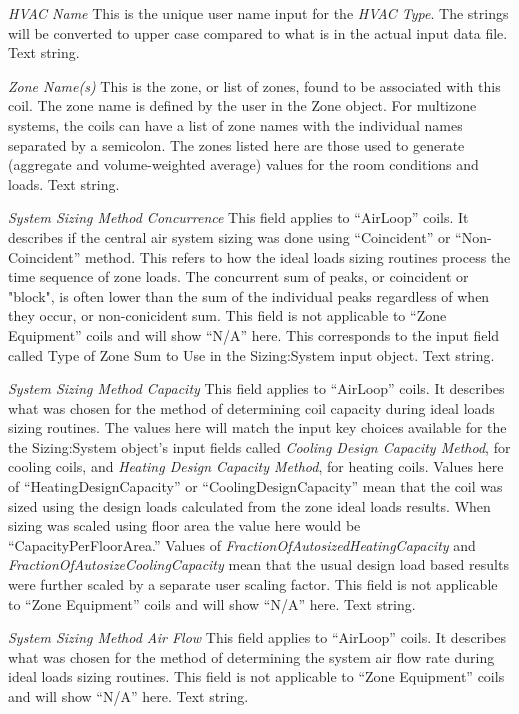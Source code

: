 \emph{HVAC Name} This is the unique user name input for the \emph{HVAC Type}.  The strings  will be converted to upper case compared to what is in the actual input data file.  Text string.

\emph{Zone Name(s)} This is the zone, or list of zones, found to be associated with this coil.  The zone name is defined by the user in the Zone object.  For multizone systems, the coils can have a list of zone names with the individual names separated by a semicolon. The zones listed here are those used to generate (aggregate and volume-weighted average) values for the room conditions and loads. Text string. 

\emph{System Sizing Method Concurrence} This field applies to ``AirLoop'' coils.  It describes if the central air system sizing was done using ``Coincident'' or ``Non-Coincident'' method. This refers to how the ideal loads sizing routines process the time sequence of zone loads.  The concurrent sum of peaks, or coincident or "block", is often lower than the sum of the individual peaks regardless of when they occur, or non-conicident sum.  This field is not applicable to ``Zone Equipment'' coils and will show ``N/A'' here.  This corresponds to the input field called Type of Zone Sum to Use in the Sizing:System input object. Text string.

\emph{System Sizing Method Capacity} This field applies to ``AirLoop'' coils.  It describes what was chosen for the method of determining coil capacity during ideal loads sizing routines. The values here will match the input key choices available for the the Sizing:System object's input fields called \emph{Cooling Design Capacity Method}, for cooling coils, and \emph{Heating Design Capacity Method}, for heating coils. Values here of ``HeatingDesignCapacity'' or ``CoolingDesignCapacity'' mean that the coil was sized using the design loads calculated from the zone ideal loads results. When sizing was scaled using floor area the value here would be ``CapacityPerFloorArea.''  Values of \emph{FractionOfAutosizedHeatingCapacity} and \emph{FractionOfAutosizeCoolingCapacity} mean that the usual design load based results were further scaled by a separate user scaling factor. This field is not applicable to ``Zone Equipment'' coils and will show ``N/A'' here. Text string.

\emph{System Sizing Method Air Flow} This field applies to ``AirLoop'' coils.  It describes what was chosen for the method of determining the system air flow rate during ideal loads sizing routines. This field is not applicable to ``Zone Equipment'' coils and will show ``N/A'' here. Text string.


